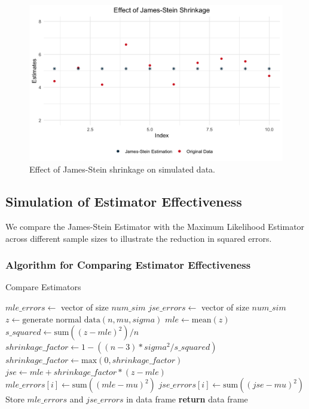 \begin{figure}[H]
    \centering
    \includegraphics[width=1\textwidth]{Effect of James-Stein Shrinkage.png}
    \caption{Effect of James-Stein shrinkage on simulated data.}
    \label{fig:jse_shrinkage}
\end{figure}

\subsection{Simulation of Estimator Effectiveness}

We compare the James-Stein Estimator with the Maximum Likelihood Estimator across different sample sizes to illustrate the reduction in squared errors.

\newpage

\subsubsection{Algorithm for Comparing Estimator Effectiveness}
\begin{algorithm}
\caption{Compare Estimators}
\begin{algorithmic}[1]
        \State $mle\_errors \gets$ vector of size $num\_sim$
        \State $jse\_errors \gets$ vector of size $num\_sim$
            \State $z \gets \text{generate normal data}(n, mu, sigma)$
            \State $mle \gets \text{mean}(z)$
            \State $s\_squared \gets \text{sum}((z - mle)^2) / n$
            \State $shrinkage\_factor \gets 1 - ((n-3) * sigma^2 / s\_squared)$
            \State $shrinkage\_factor \gets \text{max}(0, shrinkage\_factor)$
            \State $jse \gets mle + shrinkage\_factor * (z - mle)$
            \State $mle\_errors[i] \gets \text{sum}((mle - mu)^2)$
            \State $jse\_errors[i] \gets \text{sum}((jse - mu)^2)$
        \EndFor
        \State Store $mle\_errors$ and $jse\_errors$ in data frame
    \EndFor
    \State \textbf{return} data frame
\EndProcedure
\end{algorithmic}
\end{algorithm}

